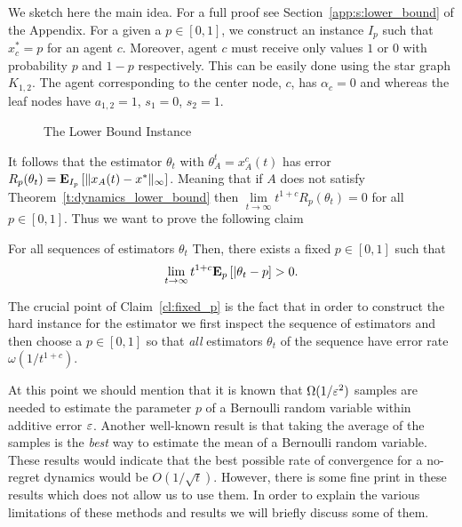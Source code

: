 We sketch here the main idea. For a full proof see Section~\ref{app:s:lower_bound}
of the Appendix.  For a given a $p \in [0,1]$, we construct an instance $I_p$ such that
$x_c^*=p$ for an agent $c$. Moreover, agent $c$ must
receive only values $1$ or $0$ with probability $p$ and $1-p$ respectively.
This can be easily done using the star graph $K_{1,2}$.
The agent corresponding to the center node, $c$, has $\alpha_c = 0$ and
whereas the leaf nodes have $a_{1,2} = 1$, $s_1 = 0$, $s_2 = 1$.
%
\begin{figure}
  \centering

  \caption{The Lower Bound Instance} \label{fig:lb_instance}
\end{figure}
%
It follows that the estimator $\theta_t$ with $\theta_A^t = x_A^c(t)$
has error $R_p(\theta_t)=\bm{\mathrm{E}}_{I_p} \left[ \| x_A(t)-x^* \|_{\infty} \right]$.
Meaning that if $A$ does not satisfy Theorem~\ref{t:dynamics_lower_bound}
then $\lim\limits_{t \rightarrow \infty}t^{1+c}R_p(\theta_t)=0$ for all
$p \in [0,1]$. Thus we want to prove the following claim
\begin{claim}\label{cl:fixed_p}
  For all sequences of estimators $\theta_t$
  Then, there exists a fixed $p \in [0,1]$ such that
  \[
    \lim_{t \to \infty} t^{1+c} \bm{\mathrm{E}}_{p} \left[ |\theta_t - p \right] > 0.
  \]
\end{claim}
The crucial point of Claim~\ref{cl:fixed_p} is the fact that
in order to construct the hard instance for the estimator
we first inspect the sequence of estimators and then choose
a $p \in [0,1]$ so that \emph{all} estimators $\theta_t$ of
the sequence have error rate $\omega(1/t^{1+c})$.

At this point we should mention that it is known
that $\Omega(1/\varepsilon^2)$ samples are needed to estimate the parameter $p$
of a Bernoulli random variable within additive error $\varepsilon$.
Another well-known result is that taking the average of the samples
is the \emph{best} way to estimate the mean of a Bernoulli random variable.
These results would indicate that the best possible rate of convergence
for a no-regret dynamics would be $O(1/\sqrt{t})$.
However, there is some fine print in these results which does not allow us
to use them. In order to explain the various limitations of
these methods and results we will briefly discuss some of them.

